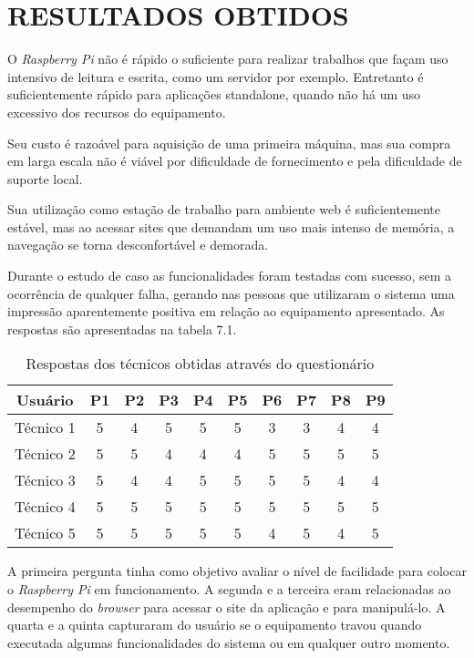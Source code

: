 \chapter{RESULTADOS OBTIDOS}

O \textit{Raspberry Pi} não é rápido o suficiente para realizar trabalhos que façam uso intensivo de leitura e escrita, como um servidor por exemplo. Entretanto é suficientemente rápido para aplicações standalone, quando não há um uso excessivo dos recursos do equipamento.

Seu custo é razoável para aquisição de uma primeira máquina, mas sua compra em larga escala não é viável por dificuldade de fornecimento e pela dificuldade de suporte local.

Sua utilização como estação de trabalho para ambiente web é suficientemente estável, mas ao acessar sites que demandam um uso mais intenso de memória, a navegação se torna desconfortável e demorada.

Durante o estudo de caso as funcionalidades foram testadas com sucesso, sem a ocorrência de qualquer falha, gerando nas pessoas que utilizaram o sistema uma impressão aparentemente positiva em relação ao equipamento apresentado. As respostas são apresentadas na tabela 7.1.

\begin{table}[!htpb]
 \centering
    \begin{tabular}{|c|c|c|c|c|c|c|c|c|c|} 
    \hline
        \textbf{Usuário} & \textbf{P1} & \textbf{P2} & \textbf{P3} & \textbf{P4} & \textbf{P5} & \textbf{P6} & \textbf{P7} & \textbf{P8} & \textbf{P9} \\
    \hline
        Técnico 1 & 5 & 4 & 5 & 5 & 5 & 3 & 3 & 4 & 4 \\
    \hline
        Técnico 2 & 5 & 5 & 4 & 4 & 4 & 5 & 5 & 5 & 5 \\
    \hline
        Técnico 3  & 5 & 4 &	4 &	5 &	5 &	5 &	5 &	4 &	4 \\
    \hline
    	Técnico 4  & 5 & 5 &	5 &	5 &	5 &	5 &	5 &	5 &	5 \\
    \hline
 	    Técnico 5  & 5 & 5 & 5 & 5 & 5 & 4 & 5 & 4 & 5 \\
    \hline
    \end{tabular}
    \caption{Respostas dos técnicos obtidas através do questionário}
    \label{t_fixa}
\end{table}

A primeira pergunta tinha como objetivo avaliar o nível de facilidade para colocar o \textit{Raspberry Pi} em funcionamento. A segunda e a terceira eram relacionadas ao desempenho do \textit{browser} para acessar o site da aplicação e para manipulá-lo. A quarta e a quinta capturaram do usuário se o equipamento travou quando executada algumas funcionalidades do sistema ou em qualquer outro momento.


